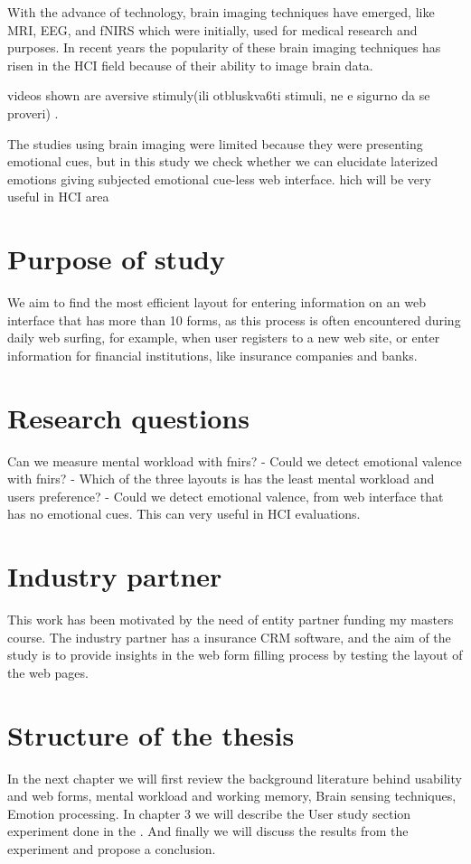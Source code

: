 \documentclass[a4paper]{report}
\begin{document}
	With the advance of technology, brain imaging techniques have emerged, like MRI, EEG, and fNIRS which were initially, used for medical research and purposes. In recent years the popularity of these brain imaging techniques has risen in the HCI field because of their ability to image brain data.
	
	videos shown are aversive stimuly(ili otbluskva6ti stimuli, ne e sigurno da se proveri) . 
	
	The studies using brain imaging were limited because they were presenting emotional cues, but in this study we check whether we can elucidate laterized emotions giving subjected emotional cue-less web interface. hich will be very useful in HCI area
	\section{Purpose of study}
		 We aim to find the most efficient layout for entering information on an web interface that has more than 10 forms, as this process is often encountered during daily web surfing, for example, when user registers to a new web site, or enter information for financial institutions, like insurance companies and banks.
	\section{Research questions}
		Can we measure mental workload with fnirs?
		- Could we detect emotional valence with fnirs?
		- Which of the three layouts is has the least mental workload and users preference?
		- Could we detect emotional valence, from web interface that has no emotional cues. This can very useful in HCI evaluations.
	\section{Industry partner}
		This work has been motivated by the need of entity partner funding my masters course. The industry partner has a insurance CRM software, and the aim of the study is to provide insights in the web form filling process by testing the layout of the web pages.
		
	\section{Structure of the thesis}
		In the next chapter we will first review the background literature behind usability and web forms, mental workload and working memory, Brain sensing techniques, Emotion processing. In chapter 3 we will describe the User study section experiment done in the . And finally we will discuss the results from the experiment and propose a conclusion.
\end{document}
